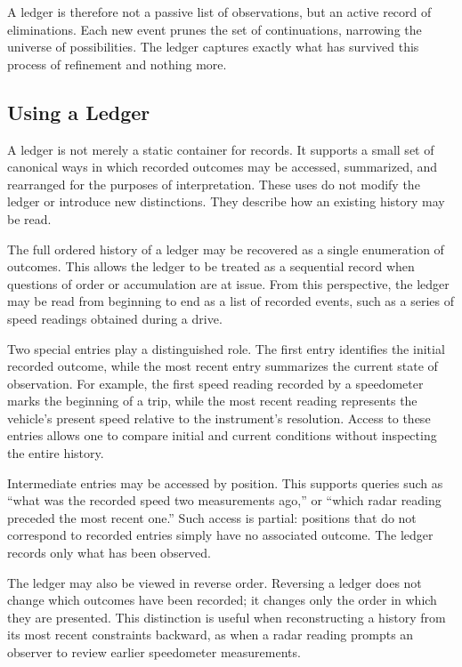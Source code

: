 A ledger is therefore not a passive list of observations, but an
active record of eliminations. Each new event prunes the set of
continuations, narrowing the universe of possibilities. The
ledger captures exactly what has survived this process of refinement and
nothing more.

\subsection{Using a Ledger}

A ledger is not merely a static container for records. It supports a small set
of canonical ways in which recorded outcomes may be accessed, summarized, and
rearranged for the purposes of interpretation. These uses do not modify the
ledger or introduce new distinctions. They describe how an existing history may
be read.

The full ordered history of a ledger may be recovered as a single enumeration of
outcomes. This allows the ledger to be treated as a sequential record when
questions of order or accumulation are at issue. From this perspective, the
ledger may be read from beginning to end as a list of recorded events, such as a
series of speed readings obtained during a drive.

Two special entries play a distinguished role. The first entry identifies the
initial recorded outcome, while the most recent entry summarizes the current
state of observation. For example, the first speed reading recorded by a
speedometer marks the beginning of a trip, while the most recent reading
represents the vehicle’s present speed relative to the instrument’s resolution.
Access to these entries allows one to compare initial and current conditions
without inspecting the entire history.

Intermediate entries may be accessed by position. This supports queries such as
“what was the recorded speed two measurements ago,” or “which radar reading
preceded the most recent one.” Such access is partial: positions that do not
correspond to recorded entries simply have no associated outcome. The ledger
records only what has been observed.

The ledger may also be viewed in reverse order. Reversing a ledger does not
change which outcomes have been recorded; it changes only the order in which
they are presented. This distinction is useful when reconstructing a history
from its most recent constraints backward, as when a radar reading prompts an
observer to review earlier speedometer measurements.

